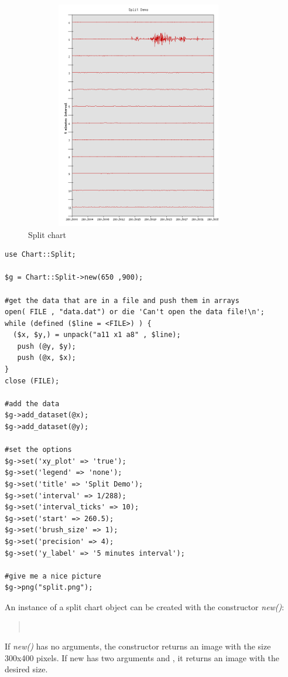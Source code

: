 \begin{figure}[h]
	\begin{center}
		\includegraphics[width = 10cm, height =10cm]{stunde.png}
	\end{center}
	\caption{Split chart}
	\label{fig:split}
\end{figure}
\begin{verbatim}
use Chart::Split;

$g = Chart::Split->new(650 ,900);

#get the data that are in a file and push them in arrays
open( FILE , "data.dat") or die 'Can't open the data file!\n';
while (defined ($line = <FILE>) ) {
  ($x, $y,) = unpack("a11 x1 a8" , $line);
   push (@y, $y);
   push (@x, $x);
}
close (FILE);

#add the data
$g->add_dataset(@x);
$g->add_dataset(@y);

#set the options
$g->set('xy_plot' => 'true');
$g->set('legend' => 'none');
$g->set('title' => 'Split Demo');
$g->set('interval' => 1/288);
$g->set('interval_ticks' => 10);
$g->set('start' => 260.5);
$g->set('brush_size' => 1);
$g->set('precision' => 4);
$g->set('y_label' => '5 minutes interval');

#give me a nice picture
$g->png("split.png");
\end{verbatim}

\begin{Constructor} 
An instance of a split chart object can be created with the constructor \textit{new()}:
\begin{quote}
\\
\end{quote}

If \textit{new()} has no arguments, 
the constructor returns an image with the size 300x400 pixels. If new has two arguments 
 and , it returns an image with the desired size.
\end{Constructor}

